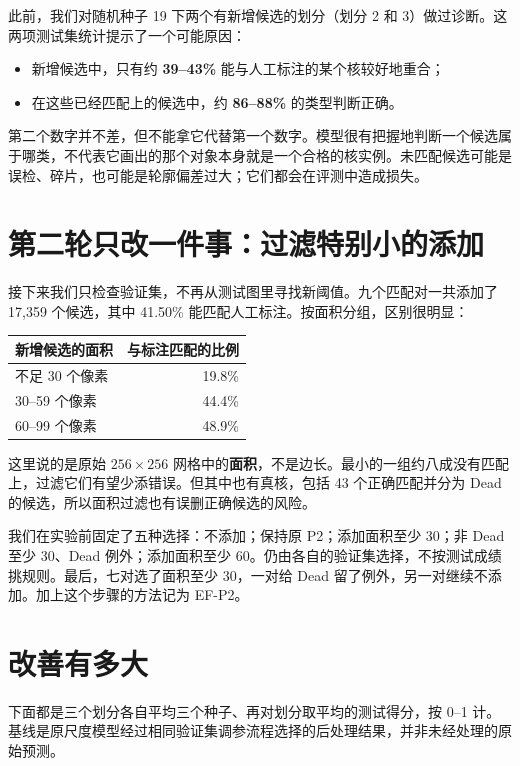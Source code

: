 \documentclass[12pt,a4paper]{article}
\begin{document}
此前，我们对随机种子 19 下两个有新增候选的划分（划分 2 和 3）做过诊断。这两项测试集统计提示了一个可能原因：
\begin{itemize}
\item 新增候选中，只有约 \textbf{39--43\%} 能与人工标注的某个核较好地重合；
\item 在这些已经匹配上的候选中，约 \textbf{86--88\%} 的类型判断正确。
\end{itemize}

第二个数字并不差，但不能拿它代替第一个数字。模型很有把握地判断一个候选属于哪类，不代表它画出的那个对象本身就是一个合格的核实例。未匹配候选可能是误检、碎片，也可能是轮廓偏差过大；它们都会在评测中造成损失。

\section*{第二轮只改一件事：过滤特别小的添加}

接下来我们只检查验证集，不再从测试图里寻找新阈值。九个匹配对一共添加了 17,359 个候选，其中 41.50\% 能匹配人工标注。按面积分组，区别很明显：

\begin{center}
\begin{tabular}{lr}\toprule
新增候选的面积 & 与标注匹配的比例\\\midrule
不足 30 个像素 & 19.8\%\\
30--59 个像素 & 44.4\%\\
60--99 个像素 & 48.9\%\\\bottomrule
\end{tabular}
\end{center}

这里说的是原始 $256\times256$ 网格中的\textbf{面积}，不是边长。最小的一组约八成没有匹配上，过滤它们有望少添错误。但其中也有真核，包括 43 个正确匹配并分为 Dead 的候选，所以面积过滤也有误删正确候选的风险。

我们在实验前固定了五种选择：不添加；保持原 P2；添加面积至少 30；非 Dead 至少 30、Dead 例外；添加面积至少 60。仍由各自的验证集选择，不按测试成绩挑规则。最后，七对选了面积至少 30，一对给 Dead 留了例外，另一对继续不添加。加上这个步骤的方法记为 EF-P2。

\section*{改善有多大}

下面都是三个划分各自平均三个种子、再对划分取平均的测试得分，按 0--1 计。基线是原尺度模型经过相同验证集调参流程选择的后处理结果，并非未经处理的原始预测。
\end{document}
